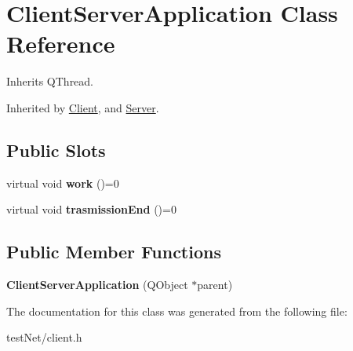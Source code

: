 \hypertarget{class_client_server_application}{\section{Client\-Server\-Application Class Reference}
\label{class_client_server_application}
}


Inherits Q\-Thread.



Inherited by \hyperlink{class_client}{Client}, and \hyperlink{class_server}{Server}.

\subsection*{Public Slots}
\begin{DoxyCompactItemize}
\item 
\hypertarget{class_client_server_application_ab4389ed734f1aa2fb7fd803266bb7e65}{virtual void {\bfseries work} ()=0}\label{class_client_server_application_ab4389ed734f1aa2fb7fd803266bb7e65}

\item 
\hypertarget{class_client_server_application_a4aa64c6371a5294788647983cac9f1f6}{virtual void {\bfseries trasmission\-End} ()=0}\label{class_client_server_application_a4aa64c6371a5294788647983cac9f1f6}

\end{DoxyCompactItemize}
\subsection*{Public Member Functions}
\begin{DoxyCompactItemize}
\item 
\hypertarget{class_client_server_application_a890dbc4526e905b1e78c0c67e8a44608}{{\bfseries Client\-Server\-Application} (Q\-Object $\ast$parent)}\label{class_client_server_application_a890dbc4526e905b1e78c0c67e8a44608}

\end{DoxyCompactItemize}


The documentation for this class was generated from the following file\-:\begin{DoxyCompactItemize}
\item 
test\-Net/client.\-h\end{DoxyCompactItemize}
